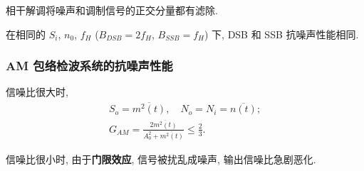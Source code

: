 相干解调将噪声和调制信号的正交分量都有滤除.

在相同的 $S_i$, $n_0$, $f_H$ ($B_{DSB}=2f_H$, $B_{SSB}=f_H$) 下, DSB 和 SSB 抗噪声性能相同.

\subsubsection{AM 包络检波系统的抗噪声性能}
信噪比很大时,
\begin{gather}
    S_o=\overline{m^2(t)}, \quad N_o=N_i=\overline{n(t)}; \\
    G_{AM}=\frac{2\overline{m^2(t)}}{A_0^2+\overline{m^2(t)}}\leq\frac{2}{3}. \label{eq:5.2 G AM}
\end{gather}

信噪比很小时, 由于\textbf{门限效应}, 信号被扰乱成噪声, 输出信噪比急剧恶化.

